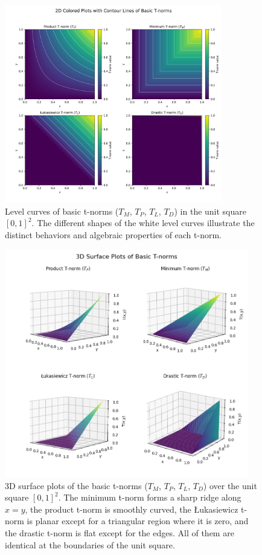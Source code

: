 \begin{figure}[ht]
    \centering
    \includegraphics[width=0.85\textwidth]{ch1/figures/tnorms_2D_plots.png}
    \caption{Level curves of basic t-norms ($T_M$, $T_P$, $T_L$, $T_D$) in the unit square $[0,1]^2$. The different shapes of the white level curves illustrate the distinct behaviors and algebraic properties of each t-norm.}
    \label{fig:2D_tnorms}
\end{figure}


\begin{figure}[!ht]
    \centering
    \includegraphics[width=0.95\textwidth]{ch1/figures/tnorms_3D_plots.png}
    \caption{3D surface plots of the basic t-norms ($T_M$, $T_P$, $T_L$, $T_D$) over the unit square $[0,1]^2$. The minimum t-norm forms a sharp ridge along $x=y$, the product t-norm is smoothly curved, the Łukasiewicz t-norm is planar except for a triangular region where it is zero, and the drastic t-norm is flat except for the edges. All of them are identical at the boundaries of the unit square.}
    \label{fig:tnorms_3D_plots}
\end{figure}


